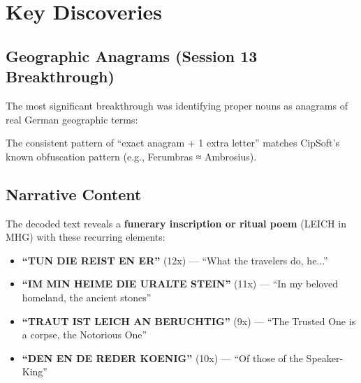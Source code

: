 \documentclass[11pt,a4paper]{article}
\begin{document}
\section{Key Discoveries}

\subsection{Geographic Anagrams (Session 13 Breakthrough)}

The most significant breakthrough was identifying proper nouns as anagrams of real German geographic terms:

\begin{table}[h]
\centering
{}
\end{table}

The consistent pattern of ``exact anagram + 1 extra letter'' matches CipSoft's known obfuscation pattern (e.g., Ferumbras ≈ Ambrosius).

\subsection{Narrative Content}

The decoded text reveals a \textbf{funerary inscription or ritual poem} (LEICH in MHG) with these recurring elements:

\begin{itemize}
\item \textbf{``TUN DIE REIST EN ER''} (12x) --- ``What the travelers do, he...''
\item \textbf{``IM MIN HEIME DIE URALTE STEIN''} (11x) --- ``In my beloved homeland, the ancient stones''
\item \textbf{``TRAUT IST LEICH AN BERUCHTIG''} (9x) --- ``The Trusted One is a corpse, the Notorious One''
\item \textbf{``DEN EN DE REDER KOENIG''} (10x) --- ``Of those of the Speaker-King''
\end{itemize}
\end{document}
